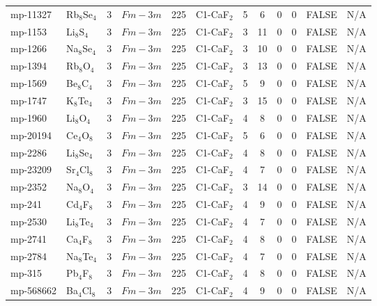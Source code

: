 {\begin{longtable}{llcccccccccc}
    mp-11327 & Rb$_{8}$Se$_{4}$ & 3     & $Fm-3m$ & 225   & C1-CaF$_{2}$ & 5     & 6     & 0     & 0     & FALSE & N/A \\
    mp-1153 & Li$_{8}$S$_{4}$ & 3     & $Fm-3m$ & 225   & C1-CaF$_{2}$ & 3     & 11    & 0     & 0     & FALSE & N/A \\
    mp-1266 & Na$_{8}$Se$_{4}$ & 3     & $Fm-3m$ & 225   & C1-CaF$_{2}$ & 3     & 10    & 0     & 0     & FALSE & N/A \\
    mp-1394 & Rb$_{8}$O$_{4}$ & 3     & $Fm-3m$ & 225   & C1-CaF$_{2}$ & 3     & 13    & 0     & 0     & FALSE & N/A \\
    mp-1569 & Be$_{8}$C$_{4}$ & 3     & $Fm-3m$ & 225   & C1-CaF$_{2}$ & 5     & 9     & 0     & 0     & FALSE & N/A \\
    mp-1747 & K$_{8}$Te$_{4}$ & 3     & $Fm-3m$ & 225   & C1-CaF$_{2}$ & 3     & 15    & 0     & 0     & FALSE & N/A \\
    mp-1960 & Li$_{8}$O$_{4}$ & 3     & $Fm-3m$ & 225   & C1-CaF$_{2}$ & 4     & 8     & 0     & 0     & FALSE & N/A \\
    mp-20194 & Ce$_{4}$O$_{8}$ & 3     & $Fm-3m$ & 225   & C1-CaF$_{2}$ & 5     & 6     & 0     & 0     & FALSE & N/A \\
    mp-2286 & Li$_{8}$Se$_{4}$ & 3     & $Fm-3m$ & 225   & C1-CaF$_{2}$ & 4     & 8     & 0     & 0     & FALSE & N/A \\
    mp-23209 & Sr$_{4}$Cl$_{8}$ & 3     & $Fm-3m$ & 225   & C1-CaF$_{2}$ & 4     & 7     & 0     & 0     & FALSE & N/A \\
    mp-2352 & Na$_{8}$O$_{4}$ & 3     & $Fm-3m$ & 225   & C1-CaF$_{2}$ & 3     & 14    & 0     & 0     & FALSE & N/A \\
    mp-241 & Cd$_{4}$F$_{8}$ & 3     & $Fm-3m$ & 225   & C1-CaF$_{2}$ & 4     & 9     & 0     & 0     & FALSE & N/A \\
    mp-2530 & Li$_{8}$Te$_{4}$ & 3     & $Fm-3m$ & 225   & C1-CaF$_{2}$ & 4     & 7     & 0     & 0     & FALSE & N/A \\
    mp-2741 & Ca$_{4}$F$_{8}$ & 3     & $Fm-3m$ & 225   & C1-CaF$_{2}$ & 4     & 8     & 0     & 0     & FALSE & N/A \\
    mp-2784 & Na$_{8}$Te$_{4}$ & 3     & $Fm-3m$ & 225   & C1-CaF$_{2}$ & 4     & 7     & 0     & 0     & FALSE & N/A \\
    mp-315 & Pb$_{4}$F$_{8}$ & 3     & $Fm-3m$ & 225   & C1-CaF$_{2}$ & 4     & 8     & 0     & 0     & FALSE & N/A \\
    mp-568662 & Ba$_{4}$Cl$_{8}$ & 3     & $Fm-3m$ & 225   & C1-CaF$_{2}$ & 4     & 9     & 0     & 0     & FALSE & N/A \\

\end{longtable}}
